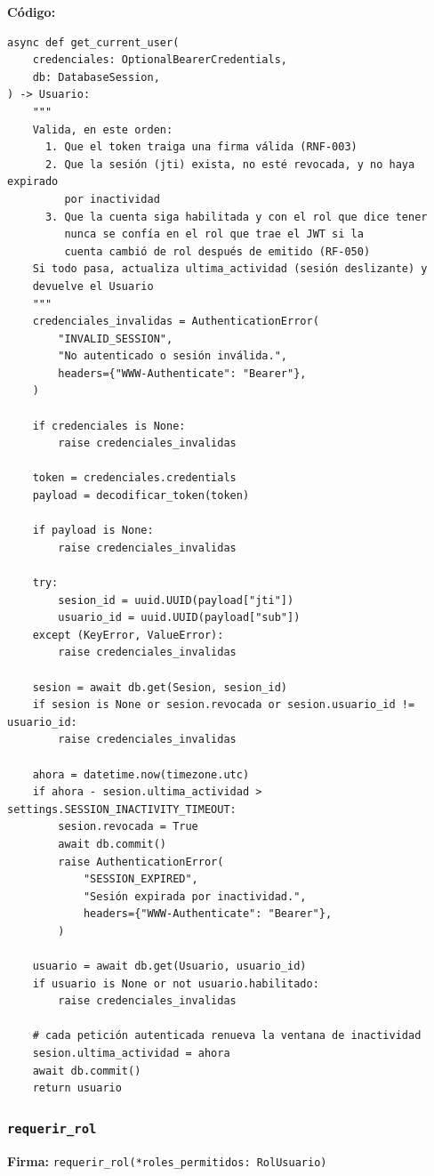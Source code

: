 \documentclass[11pt,a4paper]{article}
\begin{document}
\textbf{Código:}
\begin{lstlisting}
async def get_current_user(
    credenciales: OptionalBearerCredentials,
    db: DatabaseSession,
) -> Usuario:
    """
    Valida, en este orden:
      1. Que el token traiga una firma válida (RNF-003)
      2. Que la sesión (jti) exista, no esté revocada, y no haya expirado
         por inactividad
      3. Que la cuenta siga habilitada y con el rol que dice tener
         nunca se confía en el rol que trae el JWT si la
         cuenta cambió de rol después de emitido (RF-050)
    Si todo pasa, actualiza ultima_actividad (sesión deslizante) y
    devuelve el Usuario
    """
    credenciales_invalidas = AuthenticationError(
        "INVALID_SESSION",
        "No autenticado o sesión inválida.",
        headers={"WWW-Authenticate": "Bearer"},
    )

    if credenciales is None:
        raise credenciales_invalidas

    token = credenciales.credentials
    payload = decodificar_token(token)

    if payload is None:
        raise credenciales_invalidas

    try:
        sesion_id = uuid.UUID(payload["jti"])
        usuario_id = uuid.UUID(payload["sub"])
    except (KeyError, ValueError):
        raise credenciales_invalidas

    sesion = await db.get(Sesion, sesion_id)
    if sesion is None or sesion.revocada or sesion.usuario_id != usuario_id:
        raise credenciales_invalidas

    ahora = datetime.now(timezone.utc)
    if ahora - sesion.ultima_actividad > settings.SESSION_INACTIVITY_TIMEOUT:
        sesion.revocada = True
        await db.commit()
        raise AuthenticationError(
            "SESSION_EXPIRED",
            "Sesión expirada por inactividad.",
            headers={"WWW-Authenticate": "Bearer"},
        )

    usuario = await db.get(Usuario, usuario_id)
    if usuario is None or not usuario.habilitado:
        raise credenciales_invalidas

    # cada petición autenticada renueva la ventana de inactividad
    sesion.ultima_actividad = ahora
    await db.commit()
    return usuario
\end{lstlisting}

\subsubsection*{\texttt{requerir\_rol}}
\textbf{Firma:} \texttt{requerir\_rol(*roles\_permitidos: RolUsuario)}
\end{document}
